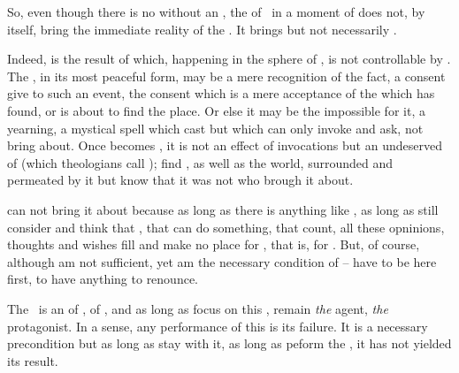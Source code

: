 \pa
So, even though there is no 
without an , the  of \yes\ in a moment of
 does not, by itself, bring the immediate reality of
the .  It brings  but not necessarily
.

Indeed,  is the result of  which, happening
in the sphere of , is not controllable by .  The \sch, in its most peaceful form, may be a mere 
recognition of the fact, a consent  give to such an event,
the consent which is a mere acceptance of the  which
  has found, or is about to find the place.  Or
else it may be the impossible  for it, a yearning, a mystical
spell which  cast but which can only  invoke and ask, 
not bring about.  Once  becomes , it is
not an effect of  invocations but an
undeserved  of  (which theologians call 
);  find ,
as well as the world, surrounded and permeated by it but  know
that it was not  who brough it about.

\pa {} can not bring it about because as long as there is anything
like , as long as  still consider  and
think that , that  can do something, that
 count, all these opninions, thoughts and wishes fill  and make no place for , that is, for
.   But, of course, although  am not 
sufficient, yet  am the necessary condition of 
 --  have to be here first, to have anything to 
renounce. 

The \sch\ is an  of , of , and as
long as  focus on this ,  remain {\em the} 
agent, {\em the} protagonist.  In a sense, any performance of this
 is its failure.  It is a necessary precondition but as long
as  stay with it, as long as  peform the , it has
not yielded its result.



